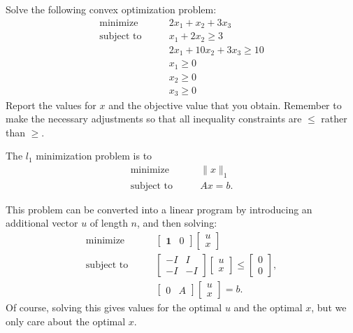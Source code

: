 \begin{problem}
Solve the following convex optimization problem:
\begin{align*}
\text{minimize}\qquad &2x_1+x_2+3x_3 \\
\text{subject to}\qquad &x_1+2x_2 \geq 3 \\
	        &2x_1+10x_2+3x_3 \geq 10 \\
		&x_1 \geq 0 \\
		&x_2 \geq 0 \\
		&x_3 \geq 0
\end{align*}
Report the values for $x$ and the objective value that you obtain.
Remember to make the necessary adjustments so that all inequality constraints are $\leq$ rather than $\geq$.
\end{problem}

The $l_1$ minimization problem is to
\begin{align*}
\text{minimize}\qquad &\|x\|_1\\
\text{subject to} \qquad &Ax = b.
\end{align*}

This problem can be converted into a linear program by introducing an additional vector $u$ of length $n$, and then solving:
\begin{align*}
\text{minimize}\qquad 
&\begin{bmatrix}
\mathbf{1} & 0
\end{bmatrix}
\begin{bmatrix}
u \\
x
\end{bmatrix}\\
\text{subject to}\qquad
&\begin{bmatrix}
-I & I\\
-I & -I
\end{bmatrix}
\begin{bmatrix}
u \\
x
\end{bmatrix}
\leq 
\begin{bmatrix}
0\\
0
\end{bmatrix},\\
&\begin{bmatrix}
0 & A
\end{bmatrix}
\begin{bmatrix}
u \\
x
\end{bmatrix}
= 
b.
\end{align*}
Of course, solving this gives values for the optimal $u$ and the optimal $x$, but we only care about the optimal $x$.

